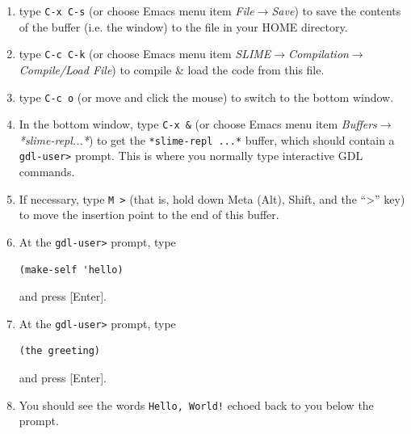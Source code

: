 \documentclass [11pt]{book}
\begin{document}
\begin{enumerate}
\begin{figure}
\begin{lrbox}{\boxedverb}
\begin{minipage}{\linewidth}
\begin{verbatim}
 (define-object hello ()

   :computed-slots 
   ((greeting "Hello, World!")))

\end{verbatim}
\end{minipage}
\end{lrbox}
\fbox{\usebox{\boxedverb}}

\caption{Example of Simple Object Definition}

\label{fig:simpleobjectdefinition}

\end{figure}

\item type \texttt{C-x C-s} (or choose Emacs menu item \emph{File$\rightarrow$Save}) to save the contents of the buffer (i.e. the window) 
to the file in your HOME directory.

\item type \texttt{C-c C-k} (or choose Emacs menu item \emph{SLIME$\rightarrow$Compilation$\rightarrow$Compile/Load File}) to compile \& load the code from this file.

\item type \texttt{C-c o} (or move and click the mouse)  to switch to the bottom window.

\item In the bottom window, type \texttt{C-x \&} (or choose Emacs menu item \emph{Buffers$\rightarrow$*slime-repl...*}) to get the \texttt{*slime-repl ...*} buffer, which should contain a \texttt{gdl-user>} prompt. This is where you normally type interactive GDL commands.

\item If necessary, type \texttt{M \textgreater} (that is, hold down Meta (Alt), Shift, and the ``\textgreater'' key) to
move the insertion point to the end of this buffer.

\item At the \texttt{gdl-user>} prompt, type 

\begin{verbatim}(make-self 'hello)
\end{verbatim} and press [Enter].

\item At the \texttt{gdl-user>} prompt, type 

\begin{verbatim}(the greeting)
\end{verbatim} and press [Enter].

\item You should see the words \texttt{Hello, World!} echoed back to you below the prompt.

\end{enumerate}
\end{document}
